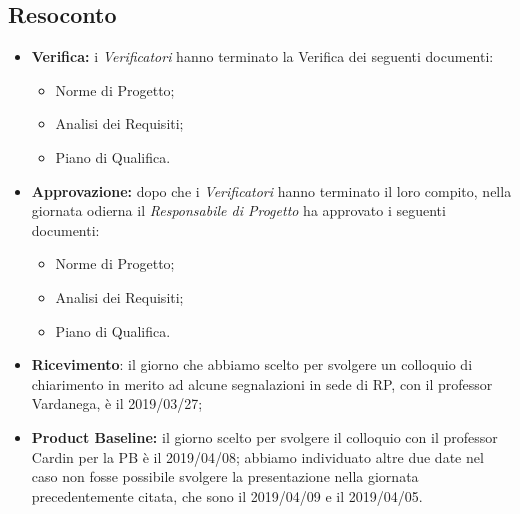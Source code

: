 \subsection{Resoconto}
\begin{itemize}
	\item { \textbf{Verifica:} i \emph{Verificatori} hanno terminato la Verifica dei seguenti documenti:
	\begin{itemize}
		\item Norme di Progetto;
		\item Analisi dei Requisiti;
		\item Piano di Qualifica.
	\end{itemize}}
	\item {\textbf{Approvazione:} dopo che i \emph{Verificatori} hanno terminato il loro compito, nella giornata odierna il \emph{Responsabile di Progetto} ha approvato i seguenti documenti:
		\begin{itemize}
			\item Norme di Progetto;
			\item Analisi dei Requisiti;
			\item Piano di Qualifica.
		\end{itemize}}
	\item {\textbf{Ricevimento}: il giorno che abbiamo scelto per svolgere un colloquio di chiarimento in merito ad alcune segnalazioni in sede di RP, con il professor Vardanega, è il 2019/03/27;}
	\item { \textbf{Product Baseline:} il giorno scelto per svolgere il colloquio con il professor Cardin per la PB è il 2019/04/08; abbiamo individuato altre due date nel caso non fosse possibile svolgere la presentazione nella giornata precedentemente citata, che sono il 2019/04/09 e il 2019/04/05.}
\end{itemize}

